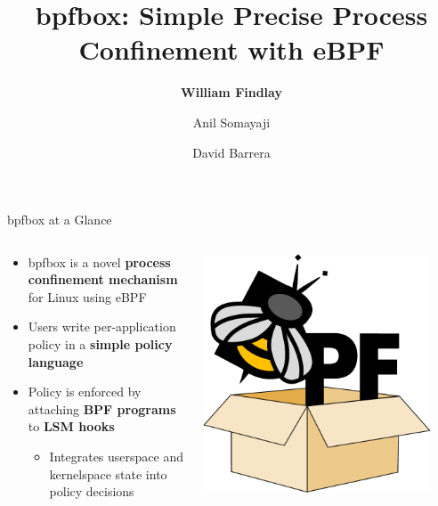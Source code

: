\documentclass[12pt, dvipsnames, aspectratio=169]{beamer}
\title{bpfbox: Simple Precise Process Confinement with eBPF}
\author{\textbf{William Findlay} \and Anil Somayaji \and David Barrera}
\institute{Carleton University\\\href{mailto:will@ccsl.carleton.ca}{\ttfamily will@ccsl.carleton.ca}}
\begin{document}

{

}

\setwatermark[hoffset=6cm, voffset=0.3cm]{}


\begin{frame}[c]{bpfbox at a Glance}
\begin{columns}
    \begin{column}{0.6\textwidth}
        \begin{itemize}
            \item bpfbox is a novel \textbf{process confinement mechanism} for Linux using eBPF
            \vspace{2em}
            \item Users write per-application policy in a \textbf{simple policy language}
            \vspace{2em}
            \item Policy is enforced by attaching \textbf{BPF programs} to \textbf{LSM hooks}%
            \begin{itemize}
                \item Integrates userspace and kernelspace state into policy decisions
            \end{itemize}
        \end{itemize}
    \end{column}
    \begin{column}{0.4\textwidth}
        \begin{center}
            \color{black}
            \includegraphics[width=0.9\textwidth]{figs/bpfbox-logo.pdf}\\

\end{center}
\end{column}
\end{columns}
\end{frame}
\end{document}
